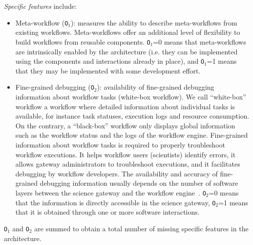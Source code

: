 \documentclass[preprint,3p,twocolumn]{elsarticle}
\newcommand{\correction}[1]{\color{blue}#1\color{black}\xspace}
\begin{document}
\emph{Specific features} include:
\begin{itemize}[leftmargin=0cm,itemindent=0.35cm,itemsep=0cm]
\item Meta-workflow (\texttt{O$_1$}): measures the ability to describe
  meta-workflows from existing workflows. Meta-workflows offer an
  additional level of flexibility to build workflows from reusable
  components. \texttt{O$_1$}=0 means that meta-workflows are
  intrinsically enabled by the architecture (i.e. they can be
  implemented using the components and interactions already in place),
  and \texttt{O$_1$}=1 means that they may be implemented with some
  development effort.
  
\item Fine-grained debugging (\texttt{O$_2$}): availability of
  fine-grained debugging information about workflow tasks (white-box
  workflow). \correction{We call ``white-box'' workflow a workflow
    where detailed information about individual tasks is available,
    for instance task statuses, execution logs and resource
    consumption. On the contrary, a ``black-box'' workflow only
    displays global information such as the workflow status and the
    logs of the workflow engine.} Fine-grained information about
  workflow tasks is required to properly troubleshoot workflow
  executions. \correction{It helps workflow users (scientists)
    identify errors, it allows gateway administrators to troubleshoot
    executions, and it facilitates debugging by workflow
    developers}. \correction{The availability and accuracy of
    fine-grained debugging information} usually depends on the number
  of software layers between the science gateway and the workflow
  engine~\cite{olabarriaga2014}. \texttt{O$_2$}=0 means that the
  information is directly accessible in the science gateway,
  \texttt{O$_2$}=1 means that it is obtained through one or more
  software interactions.
\end{itemize}
\texttt{O$_1$} and \texttt{O$_2$} are summed to obtain a total number of missing specific
features in the architecture.


\end{document}

